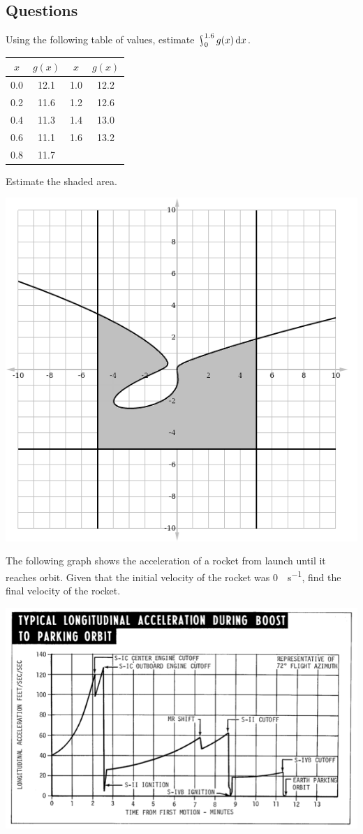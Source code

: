 \subsection*{Questions}
\begin{questions}
  \question Using the following table of values, estimate $ \rint^{1.6}_0 g(x) \dif{x} $.
            \begin{center}
              \begin{tabular}{|c|c||c|c|}\hline
                $ x $ & $ g(x) $ & $ x $ & $ g(x) $\\\hline
                0.0 & 12.1 & 1.0 & 12.2\\
                0.2 & 11.6 & 1.2 & 12.6\\
                0.4 & 11.3 & 1.4 & 13.0\\
                0.6 & 11.1 & 1.6 & 13.2\\
                0.8 & 11.7 &&\\\hline
              \end{tabular}
            \end{center}
  \question Estimate the shaded area.
            \begin{center}
              \includegraphics[width=0.5\linewidth]{aahw}
            \end{center}
  \question The following graph shows the acceleration of a rocket from launch until it reaches orbit. Given that the
            initial velocity of the rocket was \SI{0}{\foot\per\second}, find the final velocity of the rocket.
            \begin{center}
              \includegraphics[width=0.7\linewidth]{acceleration-time}
            \end{center}
\end{questions}


